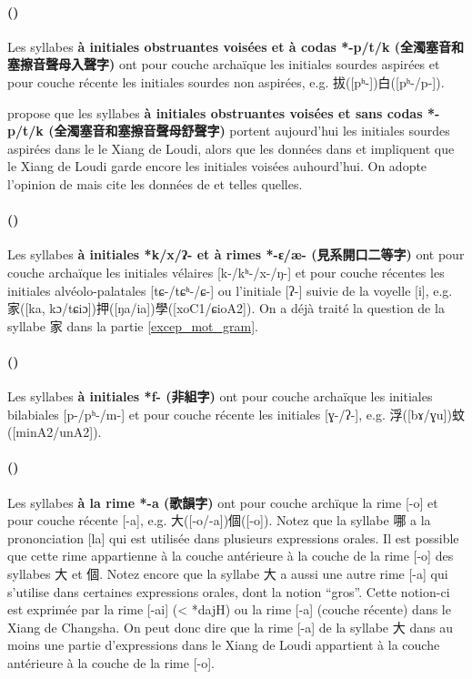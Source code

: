\documentclass{scrbook}
\newcounter{c}[subsubsection]
\newcommand{\stpc}[1]{\stepcounter{#1}}
\newcommand{\termyyx}[1]{\textbf{#1}}
\begin{document}
\begin{sloppypar}
\stpc{c}\paragraph{()}
Les syllabes \termyyx{à initiales obstruantes voisées et à codas *-p/t/k (全濁塞音和塞擦音聲母入聲字)} ont pour couche archaïque les initiales sourdes aspirées et pour couche récente les initiales sourdes non aspirées, e.g. 拔([pʰ-])白([pʰ-/p-]).

\textcite[54--60]{Chen2006xiang} propose que les syllabes \termyyx{à initiales obstruantes voisées et sans codas *-p/t/k (全濁塞音和塞擦音聲母舒聲字)} portent aujourd'hui les initiales sourdes aspirées dans le le Xiang de Loudi, alors que les données dans \textcite{Yan1994Loudi} et \textcite{Liu2001loudi} impliquent que le Xiang de Loudi garde encore les initiales voisées auhourd'hui. On adopte l'opinion de \textcite{Chen2006xiang} mais cite les données de \textcite{Yan1994Loudi} et \textcite{Liu2001loudi} telles quelles.

\stpc{c}\paragraph{()}
Les syllabes \termyyx{à initiales *k/x/ʔ- et à rimes *-ɛ/æ- (見系開口二等字)} ont pour couche archaïque les initiales vélaires [k-/kʰ-/x-/ŋ-] et pour couche récentes les initiales alvéolo-palatales [tɕ-/tɕʰ-/ɕ-] ou l'initiale [ʔ-] suivie de la voyelle [i], e.g. 家([ka, kɔ/tɕiɔ])押([ŋa/ia])學([xoC1/ɕioA2]). On a déjà traité la question de la syllabe 家 dans la partie \ref{excep_mot_gram}. 

\stpc{c}\paragraph{()}
Les syllabes \termyyx{à initiales *f- (非組字)} ont pour couche archaïque les initiales bilabiales [p-/pʰ-/m-] et pour couche récente les initiales [ɣ-/ʔ-], e.g. 浮([bɤ/ɣu])蚊([minA2/unA2]).

\stpc{c}\paragraph{()}
Les syllabes \termyyx{à la rime *-a (歌韻字)} ont pour couche archïque la rime [-o] et pour couche récente [-a], e.g. 大([-o/-a])個([-o]). Notez que la syllabe 哪 a la prononciation [la] qui est utilisée dans plusieurs expressions orales. Il est possible que cette rime appartienne à la couche antérieure à la couche de la rime [-o] des syllabes 大 et 個. Notez encore que la syllabe 大 a aussi une autre rime [-a] qui s'utilise dans certaines expressions orales, dont la notion ``gros''. Cette notion-ci est exprimée par la rime [-ai] (< *dajH) ou la rime [-a] (couche récente) dans le Xiang de Changsha. On peut donc dire que la rime [-a] de la syllabe 大 dans au moins une partie d'expressions dans le Xiang de Loudi appartient à la couche antérieure à la couche de la rime [-o].


\end{sloppypar}
\end{document}
